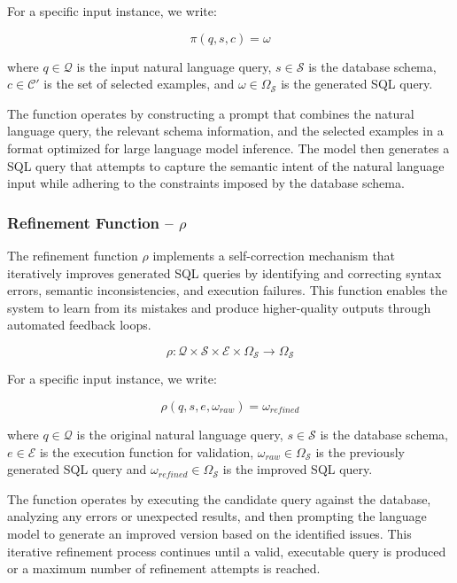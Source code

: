 \vspace{0.5em}

For a specific input instance, we write:

$$
\pi(q, s, c) = \omega
$$

\vspace{0.5em}

where $q \in \mathcal{Q}$ is the input natural language query, $s \in \mathcal{S}$ is
the database schema, $c \in \mathcal{C}'$ is the set of selected examples,
and $\omega \in \Omega_{\mathcal{S}}$ is the generated SQL query.

The function operates by constructing a prompt that combines the natural language
query, the relevant schema information, and the selected examples in a format
optimized for large language model inference. The model then generates a SQL query
that attempts to capture the semantic intent of the natural language input while
adhering to the constraints imposed by the database schema.

\subsubsection{Refinement Function – $\rho$}\label{design:refinement-function}

The refinement function $\rho$ implements a self-correction mechanism that iteratively
improves generated SQL queries by identifying and correcting syntax errors,
semantic inconsistencies, and execution failures. This function enables the system
to learn from its mistakes and produce higher-quality outputs through automated
feedback loops.

$$
\rho: \mathcal{Q} \times \mathcal{S} \times \mathcal{E} \times \Omega_{\mathcal{S}} \rightarrow \Omega_{\mathcal{S}}
$$

\vspace{0.5em}

For a specific input instance, we write:

$$
\rho(q, s, e, \omega_{raw}) = \omega_{refined}
$$

\vspace{0.5em}

where $q \in \mathcal{Q}$ is the original natural language query, $s \in \mathcal{S}$
is the database schema, $e \in \mathcal{E}$ is the execution function for
validation, $\omega_{raw} \in \Omega_{\mathcal{S}}$ is the previously generated SQL
query and $\omega_{refined} \in \Omega_{\mathcal{S}}$ is the improved SQL query.

The function operates by executing the candidate query against the database, analyzing
any errors or unexpected results, and then prompting the language model to generate
an improved version based on the identified issues. This iterative refinement
process continues until a valid, executable query is produced or a maximum number
of refinement attempts is reached.

